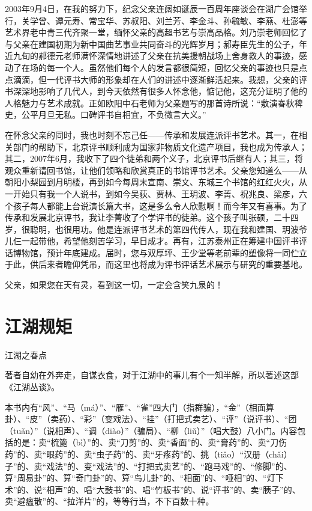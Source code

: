 \documentclass[12pt,UTF8]{ctexbook}
\begin{document}
2003年9月4日，在我的努力下，纪念父亲连阔如诞辰一百周年座谈会在湖广会馆举行，关学曾、谭元寿、常宝华、苏叔阳、刘兰芳、李金斗、孙毓敏、李燕、杜澎等艺术界老中青三代齐聚一堂，缅怀父亲的高超书艺与崇高品格。刘乃崇老师回忆了与父亲在建国初期为新中国曲艺事业共同奋斗的光辉岁月；郝寿臣先生的公子，年近九旬的郝德元老师满怀深情地讲述了父亲在抗美援朝战场上舍身救人的事迹，感动了在场的每一个人。虽然他们每个人的发言都很简短，回忆父亲的事迹也只是点点滴滴，但一代评书大师的形象却在人们的讲述中逐渐鲜活起来。我想，父亲的评书深深地影响了几代人，到今天依然有很多人怀念他，惦记他，这充分证明了他的人格魅力与艺术成就。正如欧阳中石老师为父亲题写的那首诗所说：“敷演春秋稗史，公平月旦无私。口碑评书自相宜，不负微言大义。”

在怀念父亲的同时，我也时刻不忘己任——传承和发展连派评书艺术。其一，在相关部门的帮助下，北京评书顺利成为国家非物质文化遗产项目，我也成为传承人；其二，2007年6月，我收下了四个徒弟和两个义子，北京评书后继有人；其三，将观众重新请回书馆，让他们领略和欣赏真正的书馆评书艺术。父亲您知道么——从朝阳小梨园到月明楼，再到如今每周末宣南、崇文、东城三个书馆的红红火火，从一开始只有我一个人说书，到如今吴荻、贾林、王玥波、李菁、祝兆良、梁彦，六个孩子每人都能上台说演长篇大书，这是多么令人欣慰啊！而今年又有喜事。为了传承和发展北京评书，我让李菁收了个学评书的徒弟。这个孩子叫张硕，二十四岁，很聪明，也很用功。他是连派评书艺术的第四代传人，现在我和建国、玥波爷儿仨一起带他，希望他刻苦学习，早日成才。再有，江苏泰州正在筹建中国评书评话博物馆，预计年底建成。届时，您与双厚坪、王少堂等老前辈的塑像将一同伫立于此，供后来者瞻仰凭吊，而这里也将成为评书评话艺术展示与研究的重要基地。

父亲，如果您在天有灵，看到这一切，一定会含笑九泉的！

\mainmatter

\chapter{江湖规矩}


江湖之春点


著者自幼在外奔走，自谋衣食，对于江湖中的事儿有个一知半解，所以著述这部《江湖丛谈》。

本书内有“风”、“马（má）”、“雁”、“雀”四大门（指群骗），“金”（相面算卦）、“皮”（卖药）、“彩”（变戏法）、“挂”（打把式卖艺）、“评”（说评书）、“团（tuǎn）”（说相声）、“调（diào）”（骗局）、“柳（liǔ）”（唱大鼓）八小门。内容包括的是：卖“梳篦（bì）”的、卖“刀剪”的、卖“香面”的、卖“膏药”的、卖“刀伤药”的、卖“眼药”的、卖“虫子药”的、卖“牙疼药”的、挑（tiǎo）“汉册（chǎi）子”的、卖“戏法”的、变“戏法”的、“打把式卖艺”的、“跑马戏”的、“修脚”的、算“周易卦”的、算“奇门卦”的、算“鸟儿卦”的、“相面”的、“哑相”的、“灯下术”的、说“相声”的、唱“大鼓书”的、唱“竹板书”的、说“评书”的、卖“胰子”的、卖“避瘟散”的、“拉洋片”的，等等行当，不下百数十种。
\end{document}
